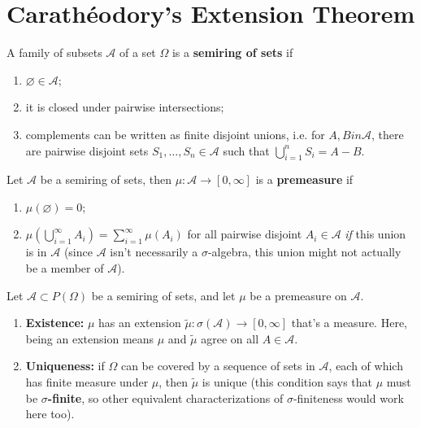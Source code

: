 \documentclass[twoside,10pt]{article}
\begin{document}
\section{Carath\'eodory's Extension Theorem}

\begin{defn}[]
A family of subsets $\mathcal{A}$ of a set $\Omega$ is a \textbf{semiring of sets} if
\begin{enumerate}
	\item $\varnothing \in \mathcal{A}$;
	\item it is closed under pairwise intersections;
	\item complements can be written as finite disjoint unions, i.e. for $A,B in \mathcal{A}$, there are pairwise disjoint sets $S_1,\dots,S_{n} \in \mathcal{A}$ such that $\bigcup_{i=1}^{n}S_{i} = A-B$.
\end{enumerate}
\end{defn}

\begin{defn}[]
Let $\mathcal{A}$ be a semiring of sets, then $\mu: \mathcal{A}\to [0,\infty]$ is a \textbf{premeasure} if
\begin{enumerate}
	\item $\mu(\varnothing)=0$;
	\item $\mu\left( \bigcup_{i=1}^{\infty}A_{i} \right) = \sum_{i=1}^{\infty}\mu(A_{i})$ for all pairwise disjoint $A_{i} \in \mathcal{A}$ \textit{if} this union is in $\mathcal{A}$ (since $\mathcal{A}$ isn't necessarily a $\sigma$-algebra, this union might not actually be a member of $\mathcal{A}$).
\end{enumerate}
\end{defn}

\begin{thrm}
	Let $\mathcal{A} \subset P(\Omega)$ be a semiring of sets, and let $\mu$ be a premeasure on $\mathcal{A}$.
	\begin{enumerate}
		\item \textbf{Existence:} $\mu$ has an extension $ \tilde{\mu}: \sigma(\mathcal{A}) \to [0,\infty]$ that's a measure. Here, being an extension means $\mu$ and $\tilde{\mu}$ agree on all $A \in \mathcal{A}$.
		\item \textbf{Uniqueness:} if $\Omega$ can be covered by a sequence of sets in $\mathcal{A}$, each of which has finite measure under $\mu$, then $\tilde{\mu}$ is unique (this condition says that $\mu$ must be $\sigma$\textbf{-finite}, so other equivalent characterizations of $\sigma$-finiteness would work here too).
	\end{enumerate}
\end{thrm}
\end{document}
